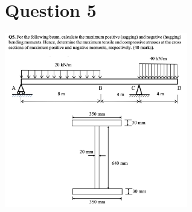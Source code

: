 \documentclass{article}
\begin{document}
\section*{Question 5}
\includegraphics[width=0.6\textwidth]{img/A3Q5.jpg}
\end{document}

